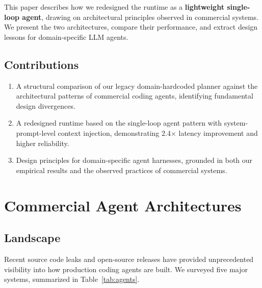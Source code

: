 \documentclass{article}
\begin{document}
This paper describes how we redesigned the runtime as a \textbf{lightweight single-loop agent}, drawing on architectural principles observed in commercial systems. We present the two architectures, compare their performance, and extract design lessons for domain-specific LLM agents.

\subsection{Contributions}

\begin{enumerate}[leftmargin=*,nosep]
  \item A structural comparison of our legacy domain-hardcoded planner against the architectural patterns of commercial coding agents, identifying fundamental design divergences.
  \item A redesigned runtime based on the single-loop agent pattern with system-prompt-level context injection, demonstrating 2.4$\times$ latency improvement and higher reliability.
  \item Design principles for domain-specific agent harnesses, grounded in both our empirical results and the observed practices of commercial systems.
\end{enumerate}

\section{Commercial Agent Architectures}

\subsection{Landscape}

Recent source code leaks and open-source releases have provided unprecedented visibility into how production coding agents are built. We surveyed five major systems, summarized in Table~\ref{tab:agents}.
\end{document}
